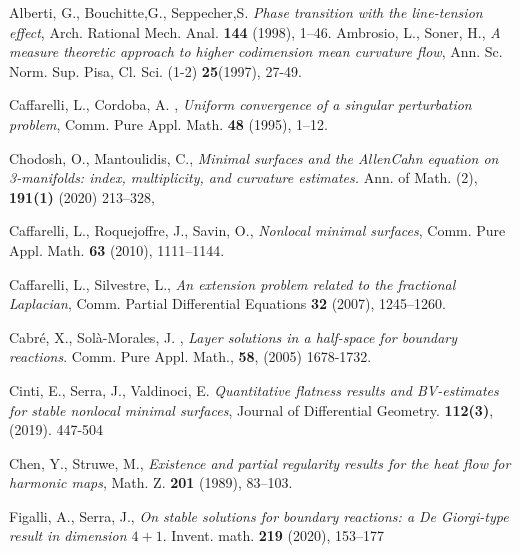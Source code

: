 \begin{thebibliography}{9}
Alberti, G., Bouchitte,G., Seppecher,S. \textit{Phase transition with the line-tension effect}, Arch. Rational Mech. Anal. \textbf{144} (1998), 1–46.
Ambrosio, L., Soner, H., \textit{A measure theoretic approach to higher codimension mean curvature
flow}, Ann. Sc. Norm. Sup. Pisa, Cl. Sci. (1-2) \textbf{25}(1997), 27-49.

Caffarelli, L., Cordoba, A. , \textit{Uniform convergence of a singular perturbation problem}, Comm.
Pure Appl. Math. \textbf{48} (1995), 1–12.

Chodosh, O., Mantoulidis, C., \textit{Minimal surfaces and the AllenCahn equation on 3-manifolds: index, multiplicity, and curvature estimates.}
Ann. of Math. (2), \textbf{191(1)} (2020) 213–328,

Caffarelli, L., Roquejoffre, J., Savin, O.,  \textit{Nonlocal minimal surfaces}, Comm. Pure Appl. Math. \textbf{63} (2010), 1111–1144.

Caffarelli, L., Silvestre, L., \textit{An extension problem related to the fractional Laplacian}, Comm. Partial Differential Equations \textbf{32} (2007), 1245–1260.

Cabré, X., Solà-Morales, J. , \textit{Layer solutions in a half-space for boundary reactions}. Comm. Pure Appl. Math., \textbf{58}, (2005) 1678-1732.

Cinti, E., Serra, J., Valdinoci, E.  \textit{Quantitative flatness results and BV-estimates for stable nonlocal minimal surfaces}, Journal of Differential Geometry. \textbf{112(3)}, (2019). 447-504

 Chen, Y., Struwe, M.,  \textit{Existence and partial regularity results for the heat flow for harmonic maps}, Math. Z. \textbf{201} (1989), 83–103.

Figalli, A., Serra, J., \textit{On stable solutions for boundary reactions: a De Giorgi-type result in dimension $4 + 1$}. Invent. math. \textbf{219} (2020), 153–177 


\end{thebibliography}
